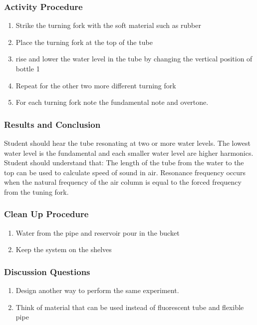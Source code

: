 \subsubsection*{Activity Procedure}
\begin{enumerate}
\item{Strike the turning fork with the soft material such as rubber}
\item{Place the turning fork at the top of the tube}
\item{rise and lower the water level in the tube by changing the vertical position of bottle 1}
\item{Repeat for the other two more different turning fork}
\item{For each turning fork note the fundamental note and overtone.} 
\end{enumerate}

\subsubsection*{Results and Conclusion}
Student should hear the tube resonating at two or more water levels. The lowest water level is the fundamental and each smaller water level are higher harmonics.  
Student should understand that: 
The length of the tube from the water to the top can be used to calculate speed of sound in air. 
Resonance frequency occurs when the natural frequency of the air column is equal to the forced frequency from the tuning fork.  

\subsubsection*{Clean Up Procedure}
\begin{enumerate}
\item{Water from the pipe and reservoir pour in the bucket}
\item{Keep the system on the shelves}
\end{enumerate}

\subsubsection*{Discussion Questions}
\begin{enumerate}
\item{Design another way to perform the same experiment.} 
\item{Think of material that can be used instead of fluorescent tube and flexible pipe}
\end{enumerate}

